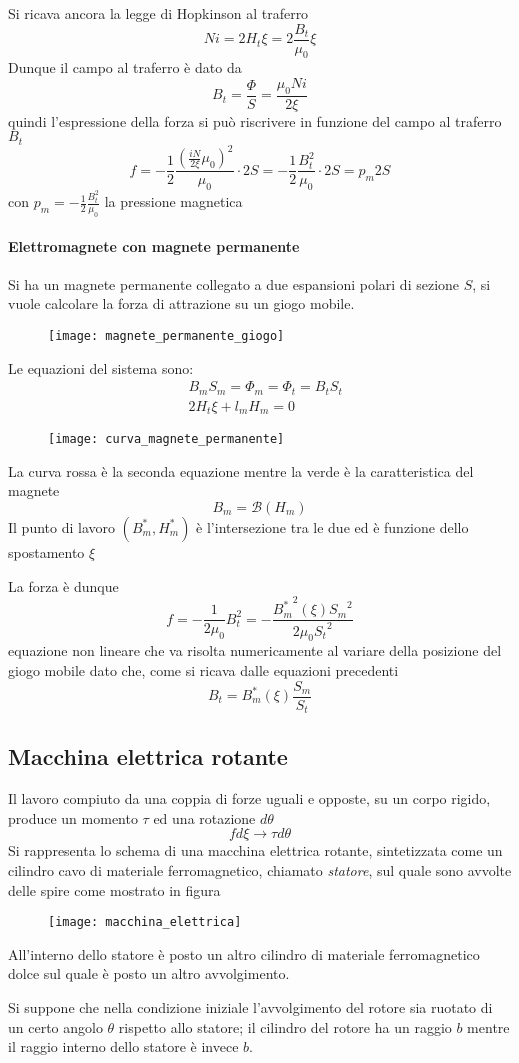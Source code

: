 Si ricava ancora la legge di Hopkinson al traferro
$$
Ni = 2H_t\xi = 2\frac{B_t}{\mu_0}\xi
$$
Dunque il campo al traferro è dato da
$$
B_t = \frac{\Phi}{S} = \frac{\mu_0Ni}{2\xi} 
$$
quindi l'espressione della forza si può riscrivere in funzione del campo al traferro $B_t$
$$
f = -\frac{1}{2}\frac{\left(\frac{iN}{2\xi}\mu_0\right)^2}{\mu_0} \cdot 2S = -\frac{1}{2}\frac{B_t^2}{\mu_0}\cdot2S
= p_m2S
$$
con $p_m = -\frac{1}{2}\frac{B_t^2}{\mu_0}$ la pressione magnetica
\newpage
\paragraph{Elettromagnete con magnete permanente}
Si ha un magnete permanente collegato a due espansioni polari di sezione $S$, si vuole calcolare la forza di 
attrazione su un giogo mobile.
\begin{figure}[H]
\centering
\texttt{[image: magnete\_permanente\_giogo]}
\end{figure}
Le equazioni del sistema sono:
$$\begin{aligned}
&B_mS_m = \Phi_m = \Phi_t = B_tS_t\\
&2H_t\xi + l_mH_m = 0
\end{aligned}
$$
\begin{figure}[H]
\centering
\texttt{[image: curva\_magnete\_permanente]}
\end{figure}
La curva rossa è la seconda equazione mentre la verde è la caratteristica del magnete
$$
B_m = \mathcal{B}(H_m)
$$
Il punto di lavoro $(B_m^*,H_m^*)$ è l'intersezione tra le due ed è funzione dello spostamento $\xi$

La forza è dunque
$$
f = -\frac{1}{2\mu_0}B_t^2 = -\frac{{B_m^*}^2(\xi){S_m}^2}{2\mu_0 {S_t}^2}
$$
equazione non lineare che va risolta numericamente al variare della posizione del giogo mobile
dato che, come si ricava dalle equazioni precedenti
$$
B_t = B_m^*(\xi)\frac{S_m}{S_t}
$$

\newpage
\subsection{Macchina elettrica rotante}
Il lavoro compiuto da una coppia di forze uguali e opposte, su un corpo rigido, produce un momento $\tau$
ed una rotazione $d\theta$
$$
fd\xi \rightarrow \tau d\theta
$$
Si rappresenta lo schema di una macchina elettrica rotante, sintetizzata come un cilindro cavo
di materiale ferromagnetico, chiamato \textit{statore}, sul quale sono avvolte delle spire come mostrato in figura
\begin{figure}[H]
\centering
\texttt{[image: macchina\_elettrica]}
\end{figure}
All'interno dello statore è posto un altro cilindro di materiale ferromagnetico dolce sul quale è posto
un altro avvolgimento.

Si suppone che nella condizione iniziale l'avvolgimento del rotore sia ruotato di un certo angolo
$\theta$ rispetto allo statore; il cilindro del rotore ha un raggio $b$ mentre il raggio interno dello 
statore è invece $b$.
